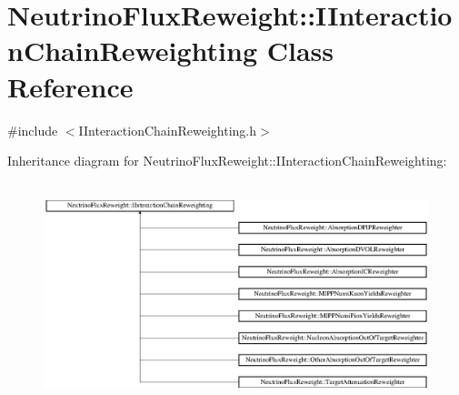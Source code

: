 \hypertarget{class_neutrino_flux_reweight_1_1_i_interaction_chain_reweighting}{\section{Neutrino\-Flux\-Reweight\-:\-:I\-Interaction\-Chain\-Reweighting Class Reference}
\label{class_neutrino_flux_reweight_1_1_i_interaction_chain_reweighting}
}


{\ttfamily \#include $<$I\-Interaction\-Chain\-Reweighting.\-h$>$}

Inheritance diagram for Neutrino\-Flux\-Reweight\-:\-:I\-Interaction\-Chain\-Reweighting\-:\begin{figure}[H]
\begin{center}
\leavevmode
\includegraphics[height=6.461539cm]{class_neutrino_flux_reweight_1_1_i_interaction_chain_reweighting}
\end{center}
\end{figure}
